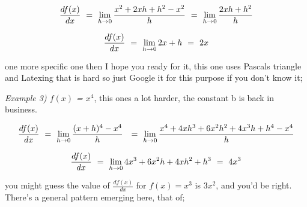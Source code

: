 \documentclass{article}
\begin{document}
\begin{equation} \label{eb-eq-310-1}
\frac{df(x)}{dx} \hspace{0.125cm} = \hspace{0.125cm} \lim_{h\to0} \frac{x^2 + 2xh + h^2 - x^2}{h} \hspace{0.125cm} = \hspace{0.125cm} \lim_{h\to0} \frac{2xh + h^2}{h} 
\end{equation}

\begin{equation} \label{eb-eq-311-1}
\frac{df(x)}{dx} \hspace{0.125cm} = \hspace{0.125cm} \lim_{h\to0} 2x + h \hspace{0.125cm} = \hspace{0.125cm} 2x
\end{equation}

one more specific one then I hope you ready for it, this one uses Pascals triangle and Latexing that is hard so just Google it for this purpose if you don't know it;

\textit{Example 3)  \begin{math} f(x) \end{math} = \begin{math} x^4 \end{math}}, this ones a lot harder, the constant b is back in business.

\begin{equation} \label{eb-eq-312-1}
\frac{df(x)}{dx} \hspace{0.125cm} = \hspace{0.125cm} \lim_{h\to0} \frac{(x + h)^4- x^4}{h} \hspace{0.125cm} \hspace{0.125cm} = \hspace{0.125cm} \lim_{h\to0} \frac{x^4 + 4x h^3 + 6 x^2 h^2 + 4 x^3 h + h^4 - x^4}{h} 
\end{equation}

\begin{equation} \label{eb-eq-313-1}
\frac{df(x)}{dx} \hspace{0.125cm} = \hspace{0.125cm} \lim_{h\to0} 4 x^3 + 6 x^2 h + 4 x h^2 + h^3 \hspace{0.125cm} = \hspace{0.125cm} 4 x^3
\end{equation}

you might guess the value of \begin{math} \frac{df(x)}{dx} \end{math} for \begin{math} f(x) = x^3 \end{math} is \begin{math} 3 x^2  \end{math}, and you'd be right. There's a general pattern emerging here, that of;
\end{document}
